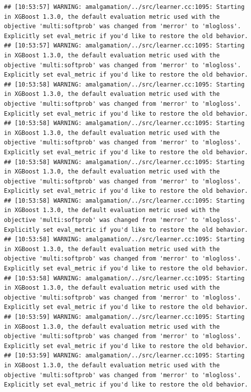 \documentclass[
]{scrbook}
\begin{document}
\begin{verbatim}
## [10:53:57] WARNING: amalgamation/../src/learner.cc:1095: Starting in XGBoost 1.3.0, the default evaluation metric used with the objective 'multi:softprob' was changed from 'merror' to 'mlogloss'. Explicitly set eval_metric if you'd like to restore the old behavior.
## [10:53:57] WARNING: amalgamation/../src/learner.cc:1095: Starting in XGBoost 1.3.0, the default evaluation metric used with the objective 'multi:softprob' was changed from 'merror' to 'mlogloss'. Explicitly set eval_metric if you'd like to restore the old behavior.
## [10:53:58] WARNING: amalgamation/../src/learner.cc:1095: Starting in XGBoost 1.3.0, the default evaluation metric used with the objective 'multi:softprob' was changed from 'merror' to 'mlogloss'. Explicitly set eval_metric if you'd like to restore the old behavior.
## [10:53:58] WARNING: amalgamation/../src/learner.cc:1095: Starting in XGBoost 1.3.0, the default evaluation metric used with the objective 'multi:softprob' was changed from 'merror' to 'mlogloss'. Explicitly set eval_metric if you'd like to restore the old behavior.
## [10:53:58] WARNING: amalgamation/../src/learner.cc:1095: Starting in XGBoost 1.3.0, the default evaluation metric used with the objective 'multi:softprob' was changed from 'merror' to 'mlogloss'. Explicitly set eval_metric if you'd like to restore the old behavior.
## [10:53:58] WARNING: amalgamation/../src/learner.cc:1095: Starting in XGBoost 1.3.0, the default evaluation metric used with the objective 'multi:softprob' was changed from 'merror' to 'mlogloss'. Explicitly set eval_metric if you'd like to restore the old behavior.
## [10:53:58] WARNING: amalgamation/../src/learner.cc:1095: Starting in XGBoost 1.3.0, the default evaluation metric used with the objective 'multi:softprob' was changed from 'merror' to 'mlogloss'. Explicitly set eval_metric if you'd like to restore the old behavior.
## [10:53:58] WARNING: amalgamation/../src/learner.cc:1095: Starting in XGBoost 1.3.0, the default evaluation metric used with the objective 'multi:softprob' was changed from 'merror' to 'mlogloss'. Explicitly set eval_metric if you'd like to restore the old behavior.
## [10:53:59] WARNING: amalgamation/../src/learner.cc:1095: Starting in XGBoost 1.3.0, the default evaluation metric used with the objective 'multi:softprob' was changed from 'merror' to 'mlogloss'. Explicitly set eval_metric if you'd like to restore the old behavior.
## [10:53:59] WARNING: amalgamation/../src/learner.cc:1095: Starting in XGBoost 1.3.0, the default evaluation metric used with the objective 'multi:softprob' was changed from 'merror' to 'mlogloss'. Explicitly set eval_metric if you'd like to restore the old behavior.

\end{verbatim}
\end{document}
